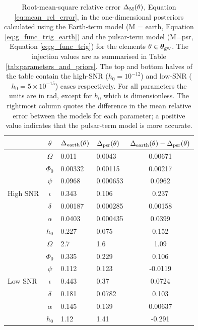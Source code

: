 \documentclass[fleqn,usenatbib,useAMS]{mnras}
\begin{document}
\begin{table}
	\centering
		\begin{tabular}{lcllc}
			\toprule
			&$\theta$ & $\Delta_{\rm earth}(\theta)$ & $\Delta_{\rm psr}(\theta)$ & $\Delta_{\rm earth}(\theta) - \Delta_{\rm psr}(\theta)$   \\
			\hline
			\multirow{7}{2mm}{High SNR} & $\Omega$       & 0.011& 0.0043& 0.00671\\
			& $\Phi_0$ &0.00332 &0.00115 &0.00217\\
			& $\psi$ &0.0968 &0.000653 &0.0962 \\
			& $\iota$ & 0.343 &0.106 &0.237 \\
			& $\delta$ & 0.00187 &0.000285 &0.00158 \\
			&$\alpha$ &0.0403 &0.000435 &0.0399 \\
			&$h_0$ & 0.227 &0.075 &0.152 \\
			\hline
			\multirow{7}{2mm}{Low SNR} & $\Omega$       & 2.7 &1.6& 1.09 \\
			& $\Phi_0$ &0.335 &0.229 &0.106 \\
			& $\psi$ &0.112 &0.123 &-0.0119 \\
			& $\iota$ & 0.443 &0.37 &0.0724 \\
			& $\delta$ & 0.181 &0.0782 &0.103 \\
			&$\alpha$ &0.145 &0.139 &0.00637 \\
			&$h_0$ & 1.12 &1.41 &-0.291 \\
			\bottomrule
		\end{tabular}
		\caption{Root-mean-square relative error $\Delta_{\rm M}(\theta)$, Equation \eqref{eq:mean_rel_error}, in the one-dimensional posteriors calculated using the Earth-term model (M = earth, Equation \eqref{eq:g_func_trig_earth}) and the pulsar-term model (M=psr, Equation \eqref{eq:g_func_trig}) for the elements $\theta \in \boldsymbol{\theta}_{\rm gw}$. The injection values are as summarised in Table \ref{tab:parameters_and_priors}. The top and bottom halves of the table contain the high-SNR ($h_0 = 10^{-12}$) and low-SNR ($h_0 = 5 \times 10^{-15}$) cases respectively.  For all parameters the units are in rad, except for $h_0$ which is dimensionless. The rightmost column quotes the difference in the mean relative error between the models for each parameter; a positive value indicates that the pulsar-term model is more accurate.}
		\label{tab:posterior_errors}
	\end{table}
\end{document}
